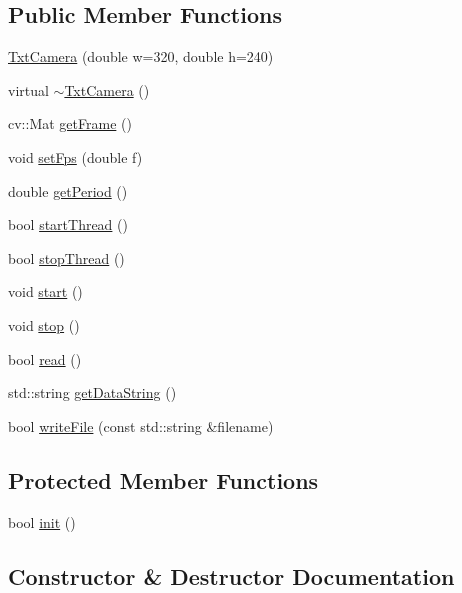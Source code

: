\subsection*{Public Member Functions}
\begin{DoxyCompactItemize}
\item 
\hyperlink{classft_1_1_txt_camera_a4a32881e0772b23576c099ce651cf6c0}{Txt\+Camera} (double w=320, double h=240)
\item 
virtual \hyperlink{classft_1_1_txt_camera_a4e75e97e7a366c89c00d847011686a60}{$\sim$\+Txt\+Camera} ()
\item 
cv\+::\+Mat \hyperlink{classft_1_1_txt_camera_ad0ab6090018d8b9abfccba4c4e8e658e}{get\+Frame} ()
\item 
void \hyperlink{classft_1_1_txt_camera_a51ae2f7221426060932bd9896c6d64b4}{set\+Fps} (double f)
\item 
double \hyperlink{classft_1_1_txt_camera_aa2f94ecad8ee2d260160993b1a1d054f}{get\+Period} ()
\item 
bool \hyperlink{classft_1_1_txt_camera_ad03f2a8c15426da1c5d901bdafb79348}{start\+Thread} ()
\item 
bool \hyperlink{classft_1_1_txt_camera_ad8d5698a3eb2f63bfd59b18315ff9b87}{stop\+Thread} ()
\item 
void \hyperlink{classft_1_1_txt_camera_a958e24a713e1647f41d94efb8ffcef62}{start} ()
\item 
void \hyperlink{classft_1_1_txt_camera_a5a5d1ba7498d7933b1137b52d268c103}{stop} ()
\item 
bool \hyperlink{classft_1_1_txt_camera_a8f428838422813898c7cc216777ea60a}{read} ()
\item 
std\+::string \hyperlink{classft_1_1_txt_camera_aef7f03534d7a00d1cfec936bf5995f1f}{get\+Data\+String} ()
\item 
bool \hyperlink{classft_1_1_txt_camera_a2aee04f25709a3a9d40010190d1a2ba2}{write\+File} (const std\+::string \&filename)
\end{DoxyCompactItemize}
\subsection*{Protected Member Functions}
\begin{DoxyCompactItemize}
\item 
bool \hyperlink{classft_1_1_txt_camera_aba6fd06b03361b015a2ff6b59e7a9f72}{init} ()
\end{DoxyCompactItemize}


\subsection{Constructor \& Destructor Documentation}
